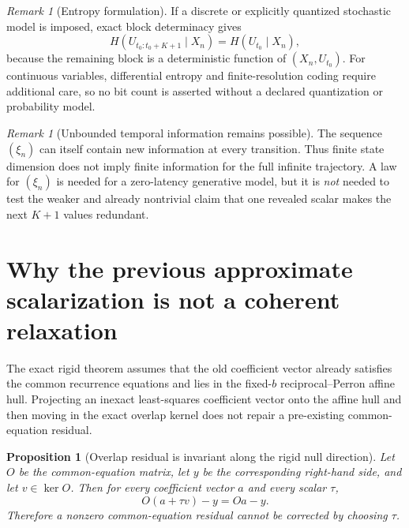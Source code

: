 \documentclass[11pt]{amsart}
\numberwithin{equation}{section}
\theoremstyle{plain}
\newtheorem{proposition}[theorem]{Proposition}
\theoremstyle{definition}
\theoremstyle{remark}
\newtheorem{remark}[theorem]{Remark}
\begin{document}
\begin{remark}[Entropy formulation]
\label{rem:entropy_formulation}
If a discrete or explicitly quantized stochastic model is imposed, exact block determinacy gives
\begin{equation}
H\!\left(U_{t_0:t_0+K+1}\mid X_n\right)=H\!\left(U_{t_0}\mid X_n\right),
\label{eq:conditional_entropy_block}
\end{equation}
because the remaining block is a deterministic function of $(X_n,U_{t_0})$. For continuous variables, differential entropy and finite-resolution coding require additional care, so no bit count is asserted without a declared quantization or probability model.
\end{remark}

\begin{remark}[Unbounded temporal information remains possible]
\label{rem:unbounded_tau_information}
The sequence $(\xi_n)$ can itself contain new information at every transition. Thus finite state dimension does not imply finite information for the full infinite trajectory. A law for $(\xi_n)$ is needed for a zero-latency generative model, but it is \emph{not} needed to test the weaker and already nontrivial claim that one revealed scalar makes the next $K+1$ values redundant.
\end{remark}

\section{Why the previous approximate scalarization is not a coherent relaxation}
\label{sec:approximate_correction}

The exact rigid theorem assumes that the old coefficient vector already satisfies the common recurrence equations and lies in the fixed-$b$ reciprocal--Perron affine hull. Projecting an inexact least-squares coefficient vector onto the affine hull and then moving in the exact overlap kernel does not repair a pre-existing common-equation residual.

\begin{proposition}[Overlap residual is invariant along the rigid null direction]
\label{prop:overlap_residual_invariant}
Let $O$ be the common-equation matrix, let $y$ be the corresponding right-hand side, and let $v\in\ker O$. Then for every coefficient vector $a$ and every scalar $\tau$,
\begin{equation}
O(a+\tau v)-y=Oa-y.
\label{eq:overlap_residual_invariant}
\end{equation}
Therefore a nonzero common-equation residual cannot be corrected by choosing $\tau$.
\end{proposition}
\end{document}
